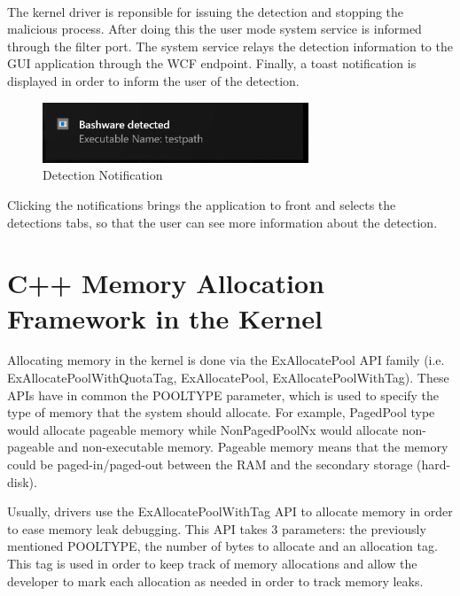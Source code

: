         \paragraph{}
        The kernel driver is reponsible for issuing the detection and stopping the malicious process. After doing this the user mode system
        service is informed through the filter port. The system service relays the detection information to the GUI application through the WCF
        endpoint. Finally, a toast notification is displayed in order to inform the user of the detection.

        \begin{figure}[H]
            \centering
            \includegraphics[width=300px, keepaspectratio]{img/detection.png}
            \caption{Detection Notification}
            \label{fig:detection}
        \end{figure}

        Clicking the notifications brings the application to front and selects the detections tabs, so that the user can see more information
        about the detection.


    \section{C++ Memory Allocation Framework in the Kernel}
        Allocating memory in the kernel is done via the ExAllocatePool API family (i.e. ExAllocatePoolWithQuotaTag, ExAllocatePool,
        ExAllocatePoolWithTag). These APIs have in common the POOL\textunderscore TYPE parameter, which is used to specify the type of memory
        that the system should allocate. For example, PagedPool type would allocate pageable memory while NonPagedPoolNx would allocate
        non-pageable and non-executable memory. Pageable memory means that the memory could be paged-in/paged-out between the RAM and the
        secondary storage (hard-disk).

        Usually, drivers use the ExAllocatePoolWithTag API to allocate memory in order to ease memory leak debugging. This API takes 3
        parameters: the previously mentioned POOL\textunderscore TYPE, the number of bytes to allocate and an allocation tag. This tag is used
        in order to keep track of memory allocations and allow the developer to mark each allocation as needed in order to track memory leaks.

